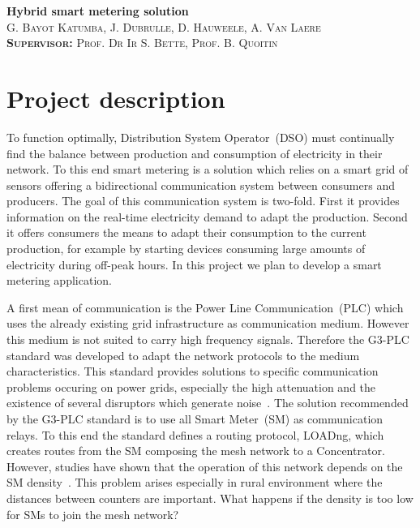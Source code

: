 \documentclass[a4paper,10pt]{article}
\begin{document}

\begin{center}
  \huge\textbf{Hybrid smart metering solution}\\
  \vspace{0.5em}
  \small\textsc{G. Bayot Katumba, J. Dubrulle, D. Hauweele, A. Van Laere}\\
  \small\textsc{\textbf{Supervisor:} Prof. Dr Ir S. Bette, Prof. B. Quoitin}
\end{center}

\section{Project description}

To function optimally, Distribution System Operator~(DSO)
must continually find the balance between production and
consumption of electricity in their network. To this end
smart metering is a solution which relies on a smart grid of
sensors offering a bidirectional communication system
between consumers and producers. The goal of this
communication system is two-fold. First it provides
information on the real-time electricity demand to adapt the
production. Second it offers consumers the means to adapt
their consumption to the current production, for example by
starting devices consuming large amounts of electricity
during off-peak hours. In this project we plan to develop a
smart metering application.

A first mean of communication is the Power Line
Communication~(PLC) which uses the already existing grid
infrastructure as communication medium. However this medium
is not suited to carry high frequency signals. Therefore the
G3-PLC standard was developed to adapt the network protocols
to the medium characteristics. This standard provides
solutions to specific communication problems occuring on
power grids, especially the high attenuation and the
existence of several disruptors which generate
noise~\cite{itu_sim2016}. The solution recommended by the
G3-PLC standard is to use all Smart Meter~(SM) as
communication relays. To this end the standard defines a
routing protocol, LOADng, which creates routes from the SM
composing the mesh network to a Concentrator. However,
studies have shown that the operation of this network
depends on the SM density~\cite{g3plc_density2015}. This
problem arises especially in rural environment where the
distances between counters are important. What happens if
the density is too low for SMs to join the mesh network?
\end{document}

